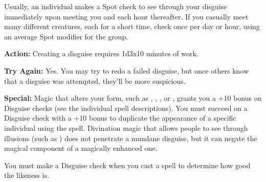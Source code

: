 Usually, an individual makes a Spot check to see through your disguise immediately upon meeting you and each hour thereafter. If you casually meet many different creatures, each for a short time, check once per day or hour, using an average Spot modifier for the group. 

\textbf{Action:} Creating a disguise requires 1d3x10 minutes of work.

\textbf{Try Again:} Yes. You may try to redo a failed disguise, but once others know that a disguise was attempted, they'll be more suspicious.

\textbf{Special:} Magic that alters your form, such as , , , or , grants you a +10 bonus on Disguise checks (see the individual spell descriptions). You must succeed on a Disguise check with a +10 bonus to duplicate the appearance of a specific individual using the  spell. Divination magic that allows people to see through illusions (such as ) does not penetrate a mundane disguise, but it can negate the magical component of a magically enhanced one.

You must make a Disguise check when you cast a  spell to determine how good the likeness is.
